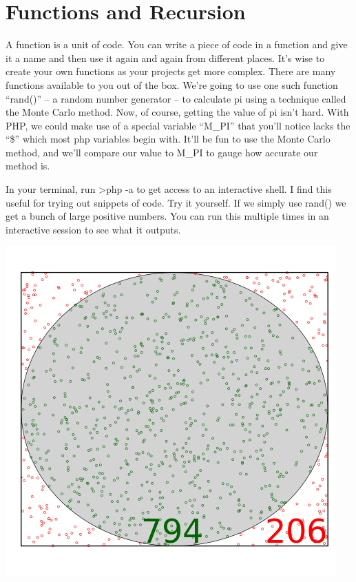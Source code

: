 \documentclass[
]{book}
\begin{document}
\hypertarget{functions-and-recursion}{%
\chapter{Functions and Recursion}\label{functions-and-recursion}}

A function is a unit of code. You can write a piece of code in a function and give it a name and then use it again and again from different places. It's wise to create your own functions as your projects get more complex. There are many functions available to you out of the box. We're going to use one such function ``rand()'' -- a random number generator -- to calculate pi using a technique called the Monte Carlo method. Now, of course, getting the value of pi isn't hard. With PHP,
we could make use of a special variable ``M\_PI'' that you'll notice lacks the ``\$'' which most php variables begin with. It'll be fun to use the Monte Carlo method, and we'll compare our value to M\_PI to gauge how accurate our method is.

In your terminal, run \textgreater php -a to get access to an interactive shell. I find this useful for trying out snippets of code. Try it yourself. If we simply use rand() we get a bunch of large positive numbers. You can run this multiple times in an interactive session to see what it outputs.

\includegraphics{480px-Circle_area_Monte_Carlo_integration2.svg.png}
\end{document}
